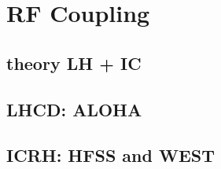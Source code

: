 \chapter{RF Coupling}

\section{theory LH + IC}

\section{LHCD: ALOHA}

\section{ICRH: HFSS and WEST}